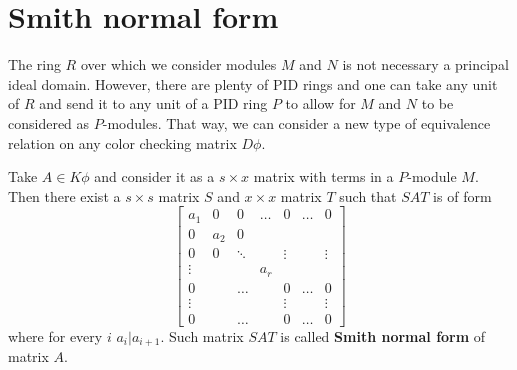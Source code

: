 \section{Smith normal form}

%
The ring $R$ over which we consider modules $M$ and $N$ is not necessary a principal ideal domain. However, there are plenty of PID rings and one can take any unit of $R$ and send it to any unit of a PID ring $P$ to allow for $M$ and $N$ to be considered as $P$-modules. That way, we can consider a new type of equivalence relation on any color checking matrix $D\phi$.
\begin{definition}
Take $A\in K\phi$ and consider it as a $s\times x$ matrix with terms in a $P$-module $M$. Then there exist a $s\times s$ matrix $S$ and $x\times x$ matrix $T$ such that $SAT$ is of form
$$
\begin{bmatrix}
  a_1 & 0 & 0 & \hdots & 0 & \hdots & 0 \\ 
  0 & a_2 & 0\\ 
  0 & 0 & \ddots & & \vdots & & \vdots\\ 
  \vdots & & & a_r\\ 
  0 & & \hdots & & 0 & \hdots & 0 \\ 
  \vdots & & & & \vdots & & \vdots\\ 
  0 & & \hdots & & 0 & \hdots & 0
\end{bmatrix}
$$
where for every $i$ $a_i|a_{i+1}$. Such matrix $SAT$ is called \textbf{Smith normal form} of matrix $A$.
\end{definition}

